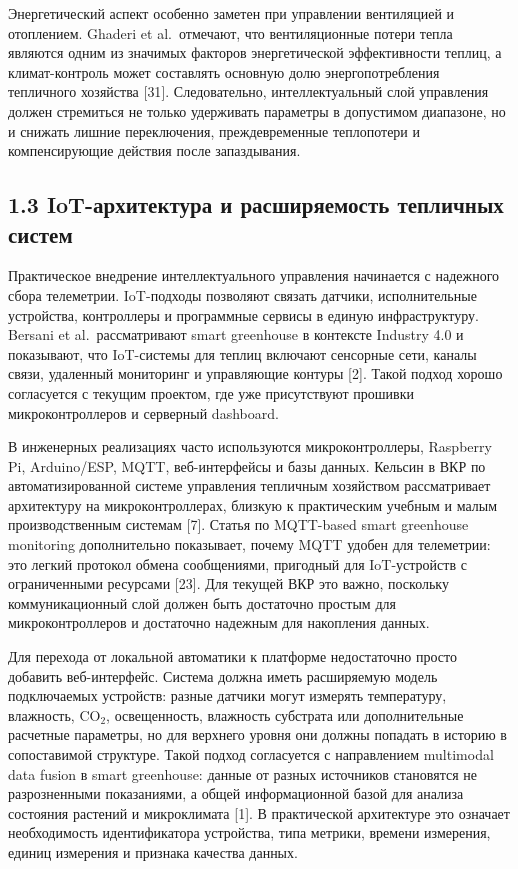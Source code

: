 \documentclass[a4paper,14pt]{extarticle}
\begin{document}
Энергетический аспект особенно заметен при управлении вентиляцией и
отоплением. Ghaderi et al.~отмечают, что вентиляционные потери тепла
являются одним из значимых факторов энергетической эффективности теплиц,
а климат-контроль может составлять основную долю энергопотребления
тепличного хозяйства {[}31{]}. Следовательно, интеллектуальный слой
управления должен стремиться не только удерживать параметры в допустимом
диапазоне, но и снижать лишние переключения, преждевременные теплопотери
и компенсирующие действия после запаздывания.

\subsection{1.3 IoT-архитектура и расширяемость тепличных
систем}\label{iot-ux430ux440ux445ux438ux442ux435ux43aux442ux443ux440ux430-ux438-ux440ux430ux441ux448ux438ux440ux44fux435ux43cux43eux441ux442ux44c-ux442ux435ux43fux43bux438ux447ux43dux44bux445-ux441ux438ux441ux442ux435ux43c}

Практическое внедрение интеллектуального управления начинается с
надежного сбора телеметрии. IoT-подходы позволяют связать датчики,
исполнительные устройства, контроллеры и программные сервисы в единую
инфраструктуру. Bersani et al.~рассматривают smart greenhouse в
контексте Industry 4.0 и показывают, что IoT-системы для теплиц включают
сенсорные сети, каналы связи, удаленный мониторинг и управляющие контуры
{[}2{]}. Такой подход хорошо согласуется с текущим проектом, где уже
присутствуют прошивки микроконтроллеров и серверный dashboard.

В инженерных реализациях часто используются микроконтроллеры, Raspberry
Pi, Arduino/ESP, MQTT, веб-интерфейсы и базы данных. Кельсин в ВКР по
автоматизированной системе управления тепличным хозяйством рассматривает
архитектуру на микроконтроллерах, близкую к практическим учебным и малым
производственным системам {[}7{]}. Статья по MQTT-based smart greenhouse
monitoring дополнительно показывает, почему MQTT удобен для телеметрии:
это легкий протокол обмена сообщениями, пригодный для IoT-устройств с
ограниченными ресурсами {[}23{]}. Для текущей ВКР это важно, поскольку
коммуникационный слой должен быть достаточно простым для
микроконтроллеров и достаточно надежным для накопления данных.

Для перехода от локальной автоматики к платформе недостаточно просто
добавить веб-интерфейс. Система должна иметь расширяемую модель
подключаемых устройств: разные датчики могут измерять температуру,
влажность, CO\(_2\), освещенность, влажность субстрата или
дополнительные расчетные параметры, но для верхнего уровня они должны
попадать в историю в сопоставимой структуре. Такой подход согласуется с
направлением multimodal data fusion в smart greenhouse: данные от разных
источников становятся не разрозненными показаниями, а общей
информационной базой для анализа состояния растений и микроклимата
{[}1{]}. В практической архитектуре это означает необходимость
идентификатора устройства, типа метрики, времени измерения, единиц
измерения и признака качества данных.
\end{document}
